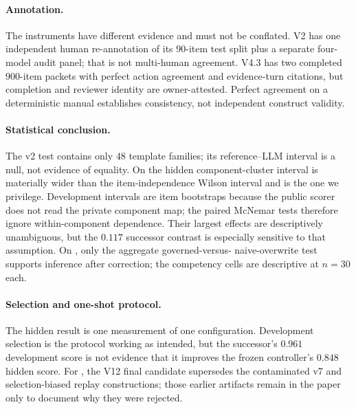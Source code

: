 \paragraph{Annotation.}
The instruments have different evidence and must not be conflated. V2 has one
independent human re-annotation of its $90$-item test split plus a separate
four-model audit panel; that is not multi-human agreement. V4.3 has two
completed $900$-item packets with perfect action agreement and evidence-turn
citations, but completion and reviewer identity are owner-attested. Perfect
agreement on a deterministic manual establishes consistency, not independent
construct validity.

\paragraph{Statistical conclusion.}
The v2 test contains only $48$ template families; its reference--LLM interval is
a null, not evidence of equality. On \mgpc{} the hidden component-cluster
interval is materially wider than the item-independence Wilson interval and is
the one we privilege. Development intervals are item bootstraps because the
public scorer does not read the private component map; the paired McNemar tests
therefore ignore within-component dependence. Their largest effects are
descriptively unambiguous, but the $0.117$ successor contrast is especially
sensitive to that assumption. On \lme{}, only the aggregate governed-versus-
naive-overwrite test supports inference after correction; the competency cells
are descriptive at $n=30$ each.

\paragraph{Selection and one-shot protocol.}
The \mgpc{} hidden result is one measurement of one configuration. Development
selection is the protocol working as intended, but the successor's $0.961$
development score is not evidence that it improves the frozen controller's
$0.848$ hidden score. For \lme{}, the V12 final candidate supersedes the
contaminated v7 and selection-biased replay constructions; those earlier
artifacts remain in the paper only to document why they were rejected.

